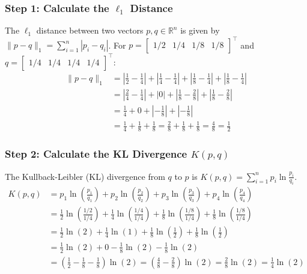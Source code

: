 \documentclass{article}
\begin{document}
\subsubsection*{Step 1: Calculate the $\ell_1$ Distance}
\parbox{\textwidth}{The $\ell_1$ distance between two vectors $p, q \in \mathbb{R}^n$ is given by $\|p-q\|_1 = \sum_{i=1}^n |p_i - q_i|$.
For $p = \begin{bmatrix} 1/2 & 1/4 & 1/8 & 1/8 \end{bmatrix}^\top$ and $q = \begin{bmatrix} 1/4 & 1/4 & 1/4 & 1/4 \end{bmatrix}^\top$:
\begin{align*}
    \|p-q\|_1 &= \left|\frac{1}{2} - \frac{1}{4}\right| + \left|\frac{1}{4} - \frac{1}{4}\right| + \left|\frac{1}{8} - \frac{1}{4}\right| + \left|\frac{1}{8} - \frac{1}{4}\right| \\
    &= \left|\frac{2}{4} - \frac{1}{4}\right| + |0| + \left|\frac{1}{8} - \frac{2}{8}\right| + \left|\frac{1}{8} - \frac{2}{8}\right| \\
    &= \frac{1}{4} + 0 + \left|-\frac{1}{8}\right| + \left|-\frac{1}{8}\right| \\
    &= \frac{1}{4} + \frac{1}{8} + \frac{1}{8} = \frac{2}{8} + \frac{1}{8} + \frac{1}{8} = \frac{4}{8} = \frac{1}{2}
\end{align*}}

\subsubsection*{Step 2: Calculate the KL Divergence $K(p, q)$}
\parbox{\textwidth}{The Kullback-Leibler (KL) divergence from $q$ to $p$ is $K(p, q) = \sum_{i=1}^n p_i \ln \frac{p_i}{q_i}$.
\begin{align*}
    K(p, q) &= p_1 \ln\left(\frac{p_1}{q_1}\right) + p_2 \ln\left(\frac{p_2}{q_2}\right) + p_3 \ln\left(\frac{p_3}{q_3}\right) + p_4 \ln\left(\frac{p_4}{q_4}\right) \\
    &= \frac{1}{2} \ln\left(\frac{1/2}{1/4}\right) + \frac{1}{4} \ln\left(\frac{1/4}{1/4}\right) + \frac{1}{8} \ln\left(\frac{1/8}{1/4}\right) + \frac{1}{8} \ln\left(\frac{1/8}{1/4}\right) \\
    &= \frac{1}{2} \ln(2) + \frac{1}{4} \ln(1) + \frac{1}{8} \ln\left(\frac{1}{2}\right) + \frac{1}{8} \ln\left(\frac{1}{2}\right) \\
    &= \frac{1}{2} \ln(2) + 0 - \frac{1}{8} \ln(2) - \frac{1}{8} \ln(2) \\
    &= \left(\frac{1}{2} - \frac{1}{8} - \frac{1}{8}\right) \ln(2) = \left(\frac{4}{8} - \frac{2}{8}\right) \ln(2) = \frac{2}{8} \ln(2) = \frac{1}{4} \ln(2)
\end{align*}}
\end{document}

